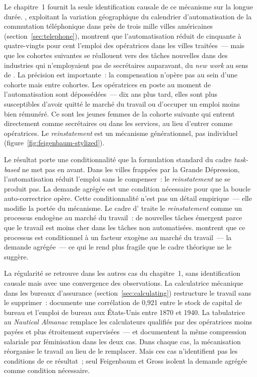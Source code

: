Le chapitre~1 fournit la seule identification causale de ce mécanisme sur la longue durée. \textcite{feigenbaum_answering_2024}, exploitant la variation géographique du calendrier d'automatisation de la commutation téléphonique dans près de trois mille villes américaines (section~\ref{sec:telephone}), montrent que l'automatisation réduit de cinquante à quatre-vingts pour cent l'emploi des opératrices dans les villes traitées~--- mais que les cohortes suivantes se réallouent vers des tâches nouvelles dans des industries qui n'employaient pas de secrétaires auparavant, du \og \emph{new work}\fg{} au sens de \textcite{autor_new_2024}. La précision est importante~: la compensation n'opère pas au sein d'une cohorte mais entre cohortes. Les opératrices en poste au moment de l'automatisation sont dépossédées~--- dix ans plus tard, elles sont plus susceptibles d'avoir quitté le marché du travail ou d'occuper un emploi moins bien rémunéré. Ce sont les jeunes femmes de la cohorte suivante qui entrent directement comme secrétaires ou dans les services, au lieu d'entrer comme opératrices. Le \emph{reinstatement} est un mécanisme générationnel, pas individuel (figure~\ref{fig:feigenbaum-stylized}).



Le résultat porte une conditionnalité que la formulation standard du cadre \emph{task-based} ne met pas en avant. Dans les villes frappées par la Grande Dépression, l'automatisation réduit l'emploi sans le compenser~: le \emph{reinstatement} ne se produit pas. La demande agrégée est une condition nécessaire pour que la boucle auto-correctrice opère. Cette conditionnalité n'est pas un détail empirique~--- elle modifie la portée du mécanisme. Le cadre d'\textcite{acemoglu_race_2018} traite le \emph{reinstatement} comme un processus endogène au marché du travail~: de nouvelles tâches émergent parce que le travail est moins cher dans les tâches non automatisées. \textcite{feigenbaum_answering_2024} montrent que ce processus est conditionnel à un facteur exogène au marché du travail~--- la demande agrégée~--- ce qui le rend plus fragile que le cadre théorique ne le suggère.

La régularité se retrouve dans les autres cas du chapitre~1, sans identification causale mais avec une convergence des observations. La calculatrice mécanique dans les bureaux d'assurance (section~\ref{sec:calculating}) restructure le travail sans le supprimer~: \textcite{reinstaller_market_2001} documente une corrélation de 0,921 entre le stock de capital de bureau et l'emploi de bureau aux États-Unis entre 1870 et 1940. La tabulatrice au \emph{Nautical Almanac} remplace les calculateurs qualifiés par des opératrices moins payées et plus étroitement supervisées~--- \textcite{davies_womans_1982} et \textcite{daston_calculation_2018} documentent la même compression salariale par féminisation dans les deux cas. Dans chaque cas, la mécanisation réorganise le travail au lieu de le remplacer. Mais ces cas n'identifient pas les conditions de ce résultat~; seul Feigenbaum et Gross isolent la demande agrégée comme condition nécessaire.

